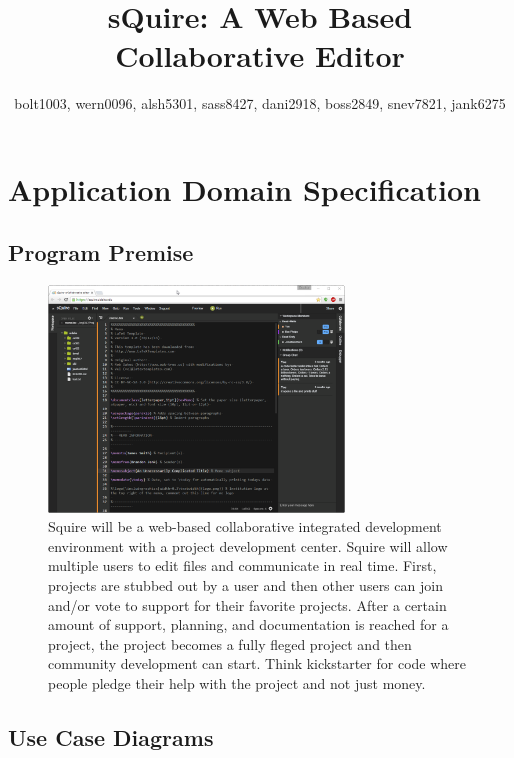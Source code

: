 \documentclass[11pt]{report}
\title{sQuire: A Web Based Collaborative Editor}
\author{bolt1003, wern0096, alsh5301, sass8427, dani2918, boss2849, snev7821, jank6275}
\begin{document}
\maketitle

\tableofcontents

\chapter{Application Domain Specification}

\section{Program Premise}
\begin{figure}[h!]
\caption{Squire will be a web-based collaborative integrated development environment with a project development center. Squire will allow multiple users to edit files and communicate in real time. First, projects are stubbed out by a user and then other users can join and/or vote to support for their favorite projects. After a certain amount of support, planning, and documentation is reached for a project, the project becomes a fully fleged project and then community development can start. Think kickstarter for code where people pledge their help with the project and not just money.}
\includegraphics[width=0.7\textwidth]{squire}
\end{figure}



\section{Use Case Diagrams}
\end{document}
